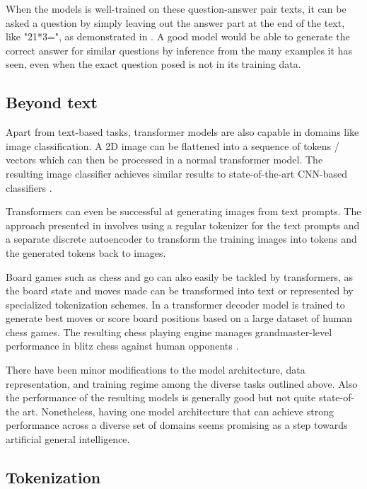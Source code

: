 When the models is well-trained on these question-answer pair texts, it can be asked a question by simply leaving out the answer part at the end of the text, like "21*3=", as demonstrated in \cite{alammar-transformer}. A good model would be able to generate the correct answer for similar questions by inference from the many examples it has seen, even when the exact question posed is not in its training data.

\subsection{Beyond text}

Apart from text-based tasks, transformer models are also capable in domains like image classification.
A 2D image can be flattened into a sequence of tokens / vectors which can then be processed in a normal transformer model. The resulting image classifier achieves similar results to state-of-the-art CNN-based classifiers .

Transformers can even be successful at generating images from text prompts. The approach presented in \cite{cogview} involves using a regular tokenizer for the text prompts and a separate discrete autoencoder to transform the training images into tokens and the generated tokens back to images.

Board games such as chess and go can also easily be tackled by transformers, as the board state and moves made can be transformed into text or represented by specialized tokenization schemes.
In \cite{grandmasterlevelchess} a transformer decoder model is trained to generate best moves or score board positions based on a large dataset of human chess games. The resulting chess playing engine manages grandmaster-level performance in blitz chess against human opponents .

There have been minor modifications to the model architecture, data representation, and training regime among the diverse tasks outlined above. Also the performance of the resulting models is generally good but not quite state-of-the art. Nonetheless, having one model architecture that can achieve strong performance across a diverse set of domains seems promising as a step towards artificial general intelligence.


\subsection{Tokenization}
\label{transformer:tokenization}

